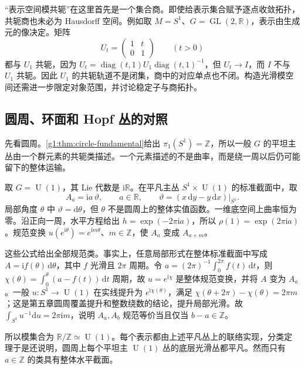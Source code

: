 \ProseParagraphBreak

“表示空间模共轭”在这里首先是一个集合商。即使给表示集合赋予逐点收敛拓扑，共轭商也未必为 Hausdorff 空间。例如取 \(M=S^1\)、\(G=\operatorname{GL}(2,\mathbb R)\)，表示由生成元的像决定。矩阵
\[
	U_t=\begin{pmatrix}1&t\\0&1\end{pmatrix}\qquad(t>0)
\]
都与 \(U_1\) 共轭，因为 \(U_t=\operatorname{diag}(t,1)U_1\operatorname{diag}(t,1)^{-1}\)，但 \(U_t\to I\)，而 \(I\) 不与 \(U_1\) 共轭。因此 \(U_1\) 的共轭轨道不是闭集，商中的对应单点也不闭。构造光滑模空间还需进一步限定对象范围，并讨论稳定子与商拓扑。

\subsection{圆周、环面和 Hopf 丛的对照}
\label{g1:subsec:1804:05}

先看圆周。\cref{g1:thm:circle-fundamental}给出 \(\pi_1(S^1)=\mathbb Z\)，所以一般 \(G\) 的平坦主丛由一个群元素的共轭类描述。一个元素描述的不是曲率，而是绕一周以后仍可能留下的整体运输。

\begin{example}\label{g1:exm:circle-principal-flat-moduli}
	取 \(G=\operatorname{U}(1)\)，其 Lie 代数是 \(\mathrm{i}\mathbb R\)。在平凡主丛 \(S^1\times\operatorname{U}(1)\) 的标准截面中，取
	\[
		A_a=\mathrm{i}a\,\vartheta,\qquad a\in\mathbb R,
		\qquad \vartheta=(x\,\mathrm{d}y-y\,\mathrm{d}x)|_{S^1}.
	\]
	局部角度 \(\theta\) 中 \(\vartheta=\mathrm{d}\theta\)，但 \(\theta\) 不是圆周上的整体实值函数。一维底空间上曲率恒为零。沿正向一周，水平方程给出 \(h=\exp(-2\pi\mathrm{i}a)\)，所以 \(\rho(1)=\exp(2\pi\mathrm{i}a)\)。规范变换 \(u(e^{\mathrm{i}\theta})=e^{\mathrm{i}m\theta}\)、\(m\in\mathbb Z\)，使 \(A_a\) 变成 \(A_{a+m}\)。

	这些公式给出全部规范类。事实上，任意局部形式在整体标准截面中写成 \(A=\mathrm{i}f(\theta)\,\mathrm{d}\theta\)，其中 \(f\) 光滑且 \(2\pi\) 周期。令 \(a=(2\pi)^{-1}\int_0^{2\pi}f(t)\,\mathrm{d}t\)，则 \(\chi(\theta)=\int_0^\theta(a-f(t))\,\mathrm{d}t\) 周期，故 \(u=e^{\mathrm{i}\chi}\) 是整体规范变换，并将 \(A\) 变为 \(A_a\)。一般 \(u:S^1\to\operatorname{U}(1)\) 在实线提升为 \(e^{\mathrm{i}\chi(\theta)}\)，满足 \(\chi(\theta+2\pi)-\chi(\theta)=2\pi m\)；这是第五章圆周覆盖提升和整数绕数的结论，提升局部光滑。故 \(\int_{S^1}u^{-1}\mathrm{d}u=2\pi\mathrm{i}m\)，说明 \(A_a,A_b\) 规范等价当且仅当 \(b-a\in\mathbb Z\)。

	所以模集合为 \(\mathbb R/\mathbb Z\simeq\operatorname{U}(1)\)。每个表示都由上述平凡丛上的联络实现，分类定理于是还说明，圆周上每个平坦主 \(\operatorname{U}(1)\) 丛的底层光滑丛都平凡。然而只有 \(a\in\mathbb Z\) 的类具有整体水平截面。
\end{example}

